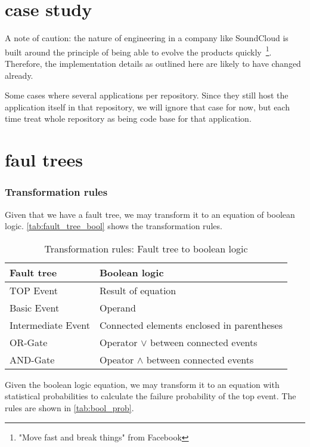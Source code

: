 

\section{case study}
A note of caution: the nature of engineering in a company like SoundCloud is built around the principle of being able to evolve the products quickly~\footnote{ "Move fast and break things" from Facebook}. Therefore, the implementation details as outlined here are likely to have changed already.

Some cases where several applications per repository. Since they still host the application itself in that repository, we will ignore that case for now, but each time treat whole repository as being code base for that application.

\section{faul trees}
\subsubsection{Transformation rules}

Given that we have a fault tree, we may transform it to an equation of boolean logic. \autoref{tab:fault_tree_bool} shows the transformation rules.

\begin{table}[ht]
  \caption{Transformation rules: Fault tree to boolean logic}
  \label{tab:fault_tree_bool}
  \begin{tabular}{ |l|l| }
    \hline
    Fault tree & Boolean logic \\
    \hline
    TOP Event & Result of equation \\
    Basic Event & Operand \\
    Intermediate Event & Connected elements enclosed in parentheses \\
    OR-Gate & Operator \(\vee\) between connected events \\
    AND-Gate & Opeator \(\wedge\) between connected events \\
    \hline
  \end{tabular}
\end{table}

Given the boolean logic equation, we may transform it to an equation with statistical probabilities to calculate the failure probability of the top event. The rules are shown in \autoref{tab:bool_prob}.

